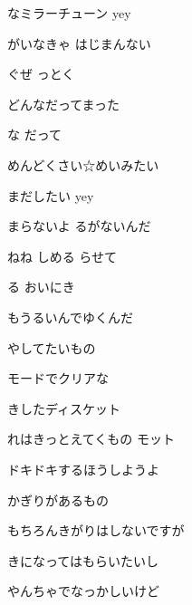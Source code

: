 \documentclass[a4paper,tate,twocolumn,12pt]{ltjtarticle}
\begin{document}
\begin{flushleft}
\begin{minipage}{\linewidth}
なミラーチューン yey
\end{minipage}

\vspace{2em}

\noindent\begin{minipage}{\linewidth}
がいなきゃ はじまんない

ぐぜ っとく

どんなだってまった

な だって

めんどくさい☆めいみたい

まだしたい yey

まらないよ るがないんだ
\end{minipage}

\vspace{2em}

\noindent\begin{minipage}{\linewidth}
ねね しめる らせて

 る おいにき

もうるいんでゆくんだ

やしてたいもの

モードでクリアな

きしたディスケット

れはきっとえてくもの モット

ドキドキするほうしようよ

かぎりがあるもの
\end{minipage}

\vspace{2em}

\noindent\begin{minipage}{\linewidth}
もちろんきがりはしないですが

きになってはもらいたいし

やんちゃでなっかしいけど


\end{minipage}
\end{flushleft}
\end{document}
